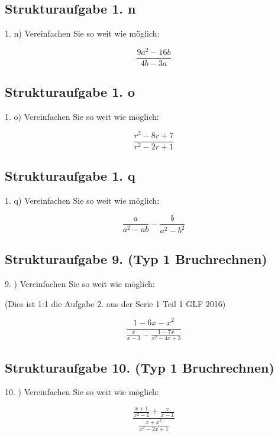 \subsection*{Strukturaufgabe 1. n}

1. n) Vereinfachen Sie so weit wie möglich:

$$\frac{9a^2-16b}{4b-3a}$$


\subsection*{Strukturaufgabe 1. o}

1. o) Vereinfachen Sie so weit wie möglich:

$$\frac{r^2-8r+7}{r^2-2r+1}$$


\subsection*{Strukturaufgabe 1. q}

1. q) Vereinfachen Sie so weit wie möglich:

$$\frac{a}{a^2-ab} - \frac{b}{a^2-b^2}$$


\subsection*{Strukturaufgabe 9. (Typ 1 Bruchrechnen)}

9. ) Vereinfachen Sie so weit wie möglich:

(Dies ist 1:1 die Aufgabe 2. aus der Serie 1 Teil 1 GLF 2016)

$$\frac{1-6x-x^2}{\frac{x}{x-3} - \frac{1-7x}{x^2-4x+3}}$$



\subsection*{Strukturaufgabe 10. (Typ 1 Bruchrechnen)}

10. ) Vereinfachen Sie so weit wie möglich:

$$\frac{\frac{x+1}{x^2-1} + \frac{x}{x-1}}{\frac{x+x^2}{x^2-2x+1}}$$

